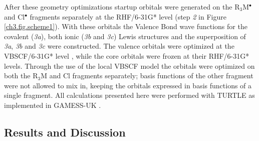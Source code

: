 After these geometry optimizations startup orbitals were generated on the R$_3$M$^{\bullet}$ and Cl$^{\bullet}$ fragments separately at the \mbox{RHF/6-31G*} level (step \textit{2} in Figure \ref{ch3.fig.scheme1}).  With these orbitals the Valence Bond wave functions for the covalent (\textit{3a}), both ionic (\textit{3b} and \textit{3c}) Lewis structures and the superposition of \textit{3a}, \textit{3b} and \textit{3c} were constructed. The valence orbitals were optimized at the \mbox{VBSCF/6-31G*} level \cite{vbscf1,vbscf2}, while the core orbitals were frozen at their \mbox{RHF/6-31G*} levels.
Through the use of the local VBSCF model the orbitals were optimized on both the R$_3$M and Cl fragments separately; basis functions of the other fragment were not allowed to mix in, keeping the orbitals expressed in basis functions of a single fragment. All calculations presented here were performed with TURTLE \cite{turtle} as implemented in GAMESS-UK \cite{gamess}.

\subsection{Results and Discussion}

